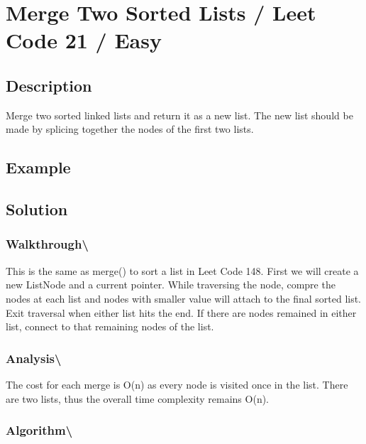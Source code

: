 \documentclass[]{book}
\begin{document}
\hypertarget{merge-two-sorted-lists-leet-code-21-easy}{%
\section{Merge Two Sorted Lists / Leet Code 21 / Easy}\label{merge-two-sorted-lists-leet-code-21-easy}}

\hypertarget{description-93}{%
\subsection{Description}\label{description-93}}

Merge two sorted linked lists and return it as a new list. The new list should be made by splicing
together the nodes of the first two lists.

\hypertarget{example-89}{%
\subsection{Example}\label{example-89}}

\hypertarget{solution-65}{%
\subsection{Solution}\label{solution-65}}

\hypertarget{walkthrough-108}{%
\subsubsection{Walkthrough\textbackslash{}}\label{walkthrough-108}}

This is the same as merge() to sort a list in Leet Code 148. First we will create a new ListNode and a
current pointer. While traversing the node, compre the nodes at each list and nodes with smaller value
will attach to the final sorted list. Exit traversal when either list hits the end. If there are nodes
remained in either list, connect to that remaining nodes of the list.

\hypertarget{analysis-115}{%
\subsubsection{Analysis\textbackslash{}}\label{analysis-115}}

The cost for each merge is O(n) as every node is visited once in the list. There are two lists, thus the overall time
complexity remains O(n).

\hypertarget{algorithm-121}{%
\subsubsection{Algorithm\textbackslash{}}\label{algorithm-121}}
\end{document}
